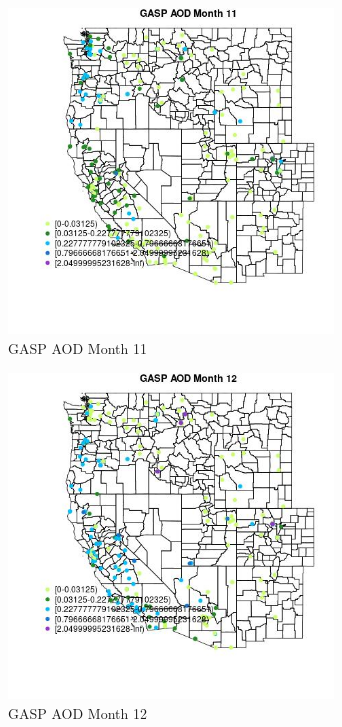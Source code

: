 \begin{figure} 
\centering  
\includegraphics[width=0.77\textwidth]{Code_Outputs/Report_ML_input_PM25_Step4_part_e_de_duplicated_aveswNAs_MapObsMo11GASP_AOD.jpg} 
\caption{\label{fig:Report_ML_input_PM25_Step4_part_e_de_duplicated_aveswNAsMapObsMo11GASP_AOD}GASP AOD Month 11} 
\end{figure} 
 

\begin{figure} 
\centering  
\includegraphics[width=0.77\textwidth]{Code_Outputs/Report_ML_input_PM25_Step4_part_e_de_duplicated_aveswNAs_MapObsMo12GASP_AOD.jpg} 
\caption{\label{fig:Report_ML_input_PM25_Step4_part_e_de_duplicated_aveswNAsMapObsMo12GASP_AOD}GASP AOD Month 12} 
\end{figure} 
 

